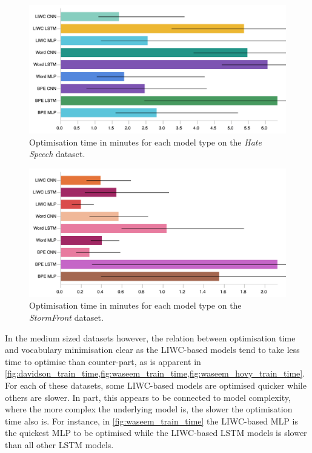 \begin{figure}[h]  
    \centering  
    \includegraphics[width=\textwidth]{waseem_hovy_train_time.pdf}  
    \caption{Optimisation time in minutes for each model type on the \textit{Hate Speech} dataset.}  
    \label{fig:waseem_hovy_train_time}  
\end{figure}  
\begin{figure}[h]  
  \centering  
  \includegraphics[width=\textwidth]{garcia_train_time.pdf}  
  \caption{Optimisation time in minutes for each model type on the \textit{StormFront} dataset.}  
  \label{fig:garcia_train_time}  
\end{figure}  
  
In the medium sized datasets however, the relation between optimisation time and vocabulary minimisation  clear as the LIWC-based models tend to take less time to optimise than counter-part, as is apparent  in \cref{fig:davidson_train_time,fig:waseem_train_time,fig:waseem_hovy_train_time}.  
For each of these datasets, some LIWC-based models are optimised quicker while others are slower.  
In part, this appears to be connected to model complexity, where the more complex the underlying model is, the slower the optimisation time also is.  
For instance, in  \cref{fig:waseem_train_time} the LIWC-based MLP is the quickest MLP to be optimised while the LIWC-based LSTM models is slower than all other LSTM models.  
  
